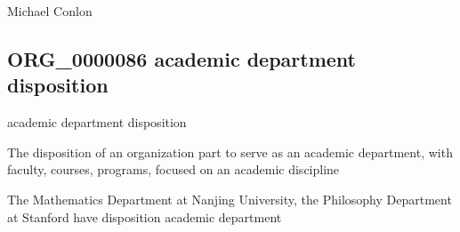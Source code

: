 \documentclass[letterpaper,10pt,english]{sphinxmanual}
\begin{document}
\begin{sphinxShadowBox}

\sphinxAtStartPar
Michael Conlon 
\end{sphinxShadowBox}
\begin{quote}

\ignorespaces \end{quote}


\subsection{ORG\_0000086 \sphinxhyphen{} academic department disposition}
\label{\detokenize{doc-ORG_0000086:org-0000086-academic-department-disposition}}\label{\detokenize{doc-ORG_0000086:index-0}}\label{\detokenize{doc-ORG_0000086::doc}}
\begin{sphinxShadowBox}

\sphinxAtStartPar
academic department disposition
\end{sphinxShadowBox}

\begin{sphinxShadowBox}

\sphinxAtStartPar
{\hyperref[\detokenize{doc-BFO_0000016::doc}]{}}
\end{sphinxShadowBox}

\begin{sphinxShadowBox}

\sphinxAtStartPar
The disposition of an organization part to serve as an academic department, with faculty, courses, programs, focused on an academic discipline
\end{sphinxShadowBox}

\begin{sphinxShadowBox}

\sphinxAtStartPar
{}
\end{sphinxShadowBox}

\begin{sphinxShadowBox}

\sphinxAtStartPar
The Mathematics Department at Nanjing University, the Philosophy Department at Stanford have disposition academic department
\end{sphinxShadowBox}
\end{document}

